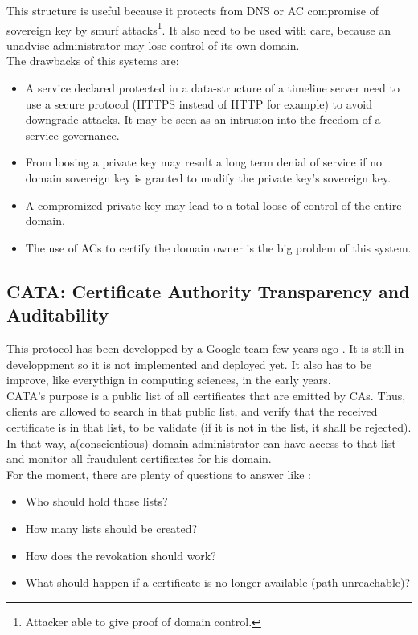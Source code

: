 \documentclass[journal, a4paper]{IEEEtran}
\begin{document}
This structure is useful because it protects from DNS or AC compromise of sovereign key by smurf attacks\footnote{Attacker able to give proof of domain control.}. It also need to be used with care, because an unadvise administrator may lose control of its own domain.\\

The drawbacks of this systems are:
\begin{itemize}
	\item A service declared protected in a data-structure of a timeline server need to use a secure protocol (HTTPS instead of HTTP for example) to avoid downgrade attacks. It may be seen as an intrusion into the freedom of a service governance.
	\item From loosing a private key may result a long term denial of service if no domain sovereign key is granted to modify the private key's sovereign key.
	\item A compromized private key may lead to a total loose of control of the entire domain.
	\item The use of ACs to certify the domain owner is the big problem of this system.
\end{itemize}

\subsection{CATA: Certificate Authority Transparency and Auditability}
\label{certtrans}

This protocol has been developped by a Google team few years ago \cite{LL11}. It is still in developpment \cite{certtransp2013} so it is not implemented and deployed yet. It also has to be improve, like everythign in computing sciences, in the early years.\\
CATA's purpose is a public list of all certificates that are emitted by CAs. Thus, clients are allowed to search in that public list, and verify that the received certificate is in that list, to be validate (if it is not in the list, it shall be rejected).\\
In that way, a(conscientious) domain administrator can have access to that list and monitor all fraudulent certificates for his domain.\\
For the moment, there are plenty of questions to answer like :
\begin{itemize}
	\item Who should hold those lists?
	\item How many lists should be created?
	\item How does the revokation should work?
	\item What should happen if a certificate is no longer available (path unreachable)?
\end{itemize}
\end{document}
